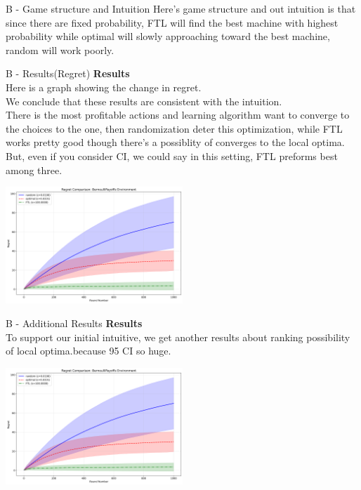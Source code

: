 \documentclass{beamer}
\begin{document}
\begin{frame}{B - Game structure and Intuition}
    Here's game structure and out intuition is that since there are fixed probability, FTL will find the best machine with highest probability while optimal will slowly approaching toward the best machine, random will work poorly.
\end{frame}

\begin{frame}{B - Results(Regret)}
\textbf{Results}\\
Here is a graph showing the change in regret. \\
We conclude that these results are consistent with the intuition. \\
There is the most profitable actions and learning algorithm want to converge to the choices to the one, then randomization deter this optimization, while FTL works pretty good though there's a possiblity of converges to the local optima. But, even if you consider CI, we could say in this setting, FTL preforms best among three.
\begin{center}
    \includegraphics[width=0.5\textwidth]{332Project2/figures/bernoulli_regret_comparison.png}
\end{center}
\end{frame}

\begin{frame}{B - Additional Results}
\textbf{Results}\\
To support our initial intuitive, we get another results about ranking
possibility of local optima.because 95 CI so huge.
\begin{center}
    \includegraphics[width=0.5\textwidth]{332Project2/figures/bernoulli_regret_comparison.png}
\end{center}
\end{frame}
\end{document}

